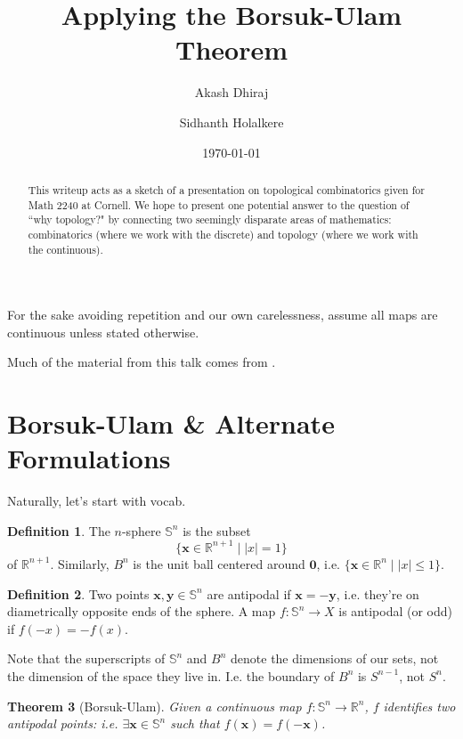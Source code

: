 \documentclass[12pt]{amsart}
\newtheorem{thm}{Theorem}[section]
\theoremstyle{definition}
\newtheorem{dfn}[thm]{Definition}
\begin{document}
    \title{Applying the Borsuk-Ulam Theorem}
    \author{Akash Dhiraj}
    \author{Sidhanth Holalkere}
    \date{\today}

    \begin{abstract}
        This writeup acts as a sketch of a presentation on topological combinatorics given for Math 2240 at Cornell. We hope to present one potential answer to the question of ``why topology?" by connecting two seemingly disparate areas of mathematics: combinatorics (where we work with the discrete) and topology (where we work with the continuous).
    \end{abstract}

    \maketitle

    For the sake avoiding repetition and our own carelessness, assume all maps are continuous unless stated otherwise. 
    
    Much of the material from this talk comes from \cite{topcombi}.

    \section{Borsuk-Ulam \& Alternate Formulations}

    Naturally, let's start with vocab.

    \begin{dfn}
    The $n$-sphere $\mathbb S^n$ is the subset $$\{\mathbf x \in \mathbb R^{n+1} \mid |x| = 1\}$$ of $\mathbb R^{n+1}$. Similarly, $B^n$ is the unit ball centered around $\mathbf 0$, i.e. $\{\mathbf x \in \mathbb R^n \mid |x| \leq 1\}$.
    \end{dfn}

    \begin{dfn}
        Two points $\mathbf x, \mathbf y \in \mathbb S^n$ are antipodal if $\mathbf x = -\mathbf y$, i.e. they're on diametrically opposite ends of the sphere. A map $f: \mathbb S^n \to X$ is antipodal (or odd) if $f(-x) = -f(x)$.
    \end{dfn}

    Note that the superscripts of $\mathbb S^n$ and $B^n$ denote the dimensions of our sets, not the dimension of the space they live in. I.e. the boundary of $B^n$ is $S^{n-1}$, not $S^n$.

    \begin{thm}[Borsuk-Ulam]
        \label{main}
        Given a continuous map $f: \mathbb S^n \to \mathbb R^n$, $f$ identifies two antipodal points: i.e. $\exists \mathbf x \in \mathbb S^n$ such that $f(\mathbf x) = f(-\mathbf x)$.
    \end{thm}
\end{document}

